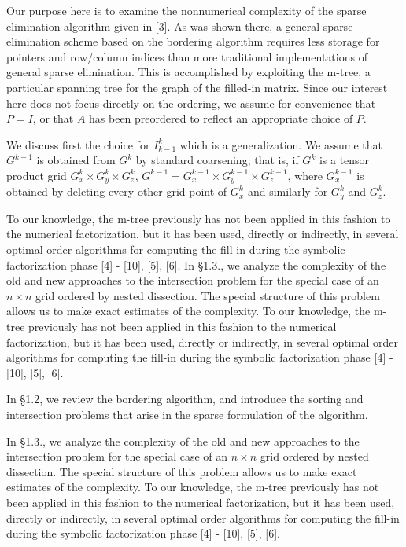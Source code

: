 Our purpose here is to examine the nonnumerical complexity of the
sparse elimination algorithm given in  [3].
As was shown there, a general sparse elimination scheme based on the
bordering algorithm requires less storage for pointers and
row/column indices than more traditional implementations of general
sparse elimination. This is accomplished by exploiting the m-tree,
a particular spanning tree for the graph of the filled-in matrix.
Since our interest here does not
focus directly on the ordering, we assume for convenience that $P=I$,
or that $A$ has been preordered to reflect an appropriate choice of $P$.


We discuss first the choice for $I_{k-1}^k$
which is a generalization. We assume that $G^{k-1}$ is
obtained
from $G^k$
by standard coarsening; that is, if $G^k$ is a tensor product
grid $G_{x}^k \times G_{y}^k \times G_{z}^k$,
$G^{k-1}=G_{x}^{k-1} \times G_{y}^{k-1} \times G_{z}^{k-1}$,
where $G_{x}^{k-1}$ is obtained by deleting every other grid
point of $G_x^k$ and similarly for $G_{y}^k$ and $G_{z}^k$.
\endlem



To our knowledge, the m-tree previously has not been applied in this
fashion to the numerical factorization, but it has been used,
directly or indirectly, in several optimal order algorithms for
computing the fill-in during the symbolic factorization phase
[4] - [10], [5], [6]. In \S 1.3., we analyze the complexity of the old and new
approaches to the intersection problem for the special case of
an $n \times n$ grid ordered by nested dissection. The special
structure of this problem allows us to make exact estimates of
the complexity. To our knowledge, the m-tree previously has not been applied in this
fashion to the numerical factorization, but it has been used,
directly or indirectly, in several optimal order algorithms for
computing the fill-in during the symbolic factorization phase
[4] - [10], [5], [6].


In \S 1.2, we review the bordering algorithm, and introduce
the sorting and intersection problems that arise in the
sparse formulation of the algorithm.  

 In \S 1.3., we analyze the complexity of the old and new
approaches to the intersection problem for the special case of
an $n \times n$ grid ordered by nested dissection. The special
structure of this problem allows us to make exact estimates of
the complexity. To our knowledge, the m-tree previously has not been applied in this
fashion to the numerical factorization, but it has been used,
directly or indirectly, in several optimal order algorithms for
computing the fill-in during the symbolic factorization phase
[4] - [10], [5], [6].


